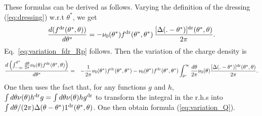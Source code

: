 \documentclass[submission, Phys]{SciPost}
\begin{document}
\begin{appendix}
These formulas can be derived as follows. Varying the definition of the dressing (\ref{eq:dressing}) w.r.t $\theta^*$, we get
\begin{equation*}
	\label{eq:var1}
\frac{d ( f^{\rm dr}(\theta^*,\theta) )}{d\theta^*}  =  -  \nu_0 (\theta^*) f^{\rm dr}(\theta^*,\theta^*) \, \frac{[ \Delta(.-\theta^*) ]^{\rm dr}(\theta^*,\theta)}{2\pi} .
\end{equation*}
Eq.~\eqref{eq:variation_fdr_Rp} follows. 
Then the variation of the charge density is
\begin{eqnarray*}
\nonumber			\frac{d \left(  \int^{\theta^*}_{-\infty} \frac{d \theta}{2\pi} \nu_0 (\theta)   f^{\rm dr}(\theta^*,\theta) \right)}{d\theta^*}  \nonumber &=&  -\frac{1}{2\pi} \nu_0(\theta^*) f^{\rm dr} (\theta^*,\theta^*)    - \nu_0 (\theta^*) f^{\rm dr}(\theta^*,\theta^*) \int_{\theta^*}^\infty \frac{d\theta   }{2\pi}  \nu_0 (\theta)   \frac{[ \Delta(.-\theta^*) ]^{\rm dr}(\theta^*,\theta)}{2\pi}   .\\
\end{eqnarray*}	
One then uses the fact that, for any functions $g$ and $h$,  $\int d\theta\nu(\theta)h^{\rm dr} g = 
\int d\theta\nu(\theta)h g^{\rm dr} $ to transform the integral in the r.h.s into $\int d\theta/(2\pi)\Delta(\theta-\theta^*)1^{\rm dr}(\theta^*,\theta)$. 
One then obtain formula (\ref{eq:variation_Q}). %


\end{appendix}
\end{document}
